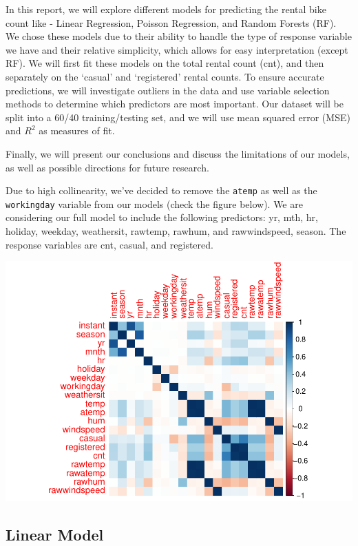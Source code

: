 \documentclass[
]{article}
\begin{document}
In this report, we will explore different models for predicting the
rental bike count like - Linear Regression, Poisson Regression, and
Random Forests (RF). We chose these models due to their ability to
handle the type of response variable we have and their relative
simplicity, which allows for easy interpretation (except RF). We will
first fit these models on the total rental count (cnt), and then
separately on the `casual' and `registered' rental counts. To ensure
accurate predictions, we will investigate outliers in the data and use
variable selection methods to determine which predictors are most
important. Our dataset will be split into a 60/40 training/testing set,
and we will use mean squared error (MSE) and \(R^2\) as measures of fit.

Finally, we will present our conclusions and discuss the limitations of
our models, as well as possible directions for future research.

Due to high collinearity, we've decided to remove the \texttt{atemp} as
well as the \texttt{workingday} variable from our models (check the
figure below). We are considering our full model to include the
following predictors: yr, mth, hr, holiday, weekday, weathersit,
rawtemp, rawhum, and rawwindspeed, season. The response variables are
cnt, casual, and registered.

\includegraphics{test_files/figure-latex/unnamed-chunk-2-1.pdf}

\hypertarget{linear-model}{%
\subsection{Linear Model}\label{linear-model}}
\end{document}
